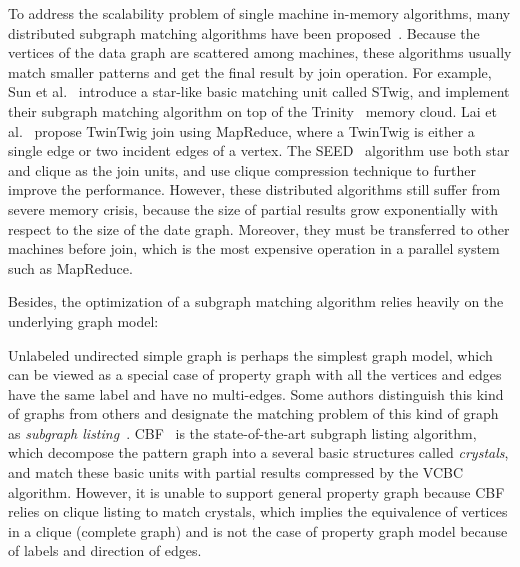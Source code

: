 To address the scalability problem of single machine in-memory algorithms,
many distributed subgraph matching algorithms have been proposed~\cite{DBLP:journals/pvldb/SunWWSL12,DBLP:conf/sigmod/ShaoCCMYX14,DBLP:journals/pvldb/LaiQLC15,DBLP:journals/pvldb/LaiQLZC16,DBLP:conf/cloud/SerafiniMS17}.
Because the vertices of the data graph are scattered among machines,
these algorithms usually match smaller patterns and get the final result by join operation.
For example, Sun et al.~\cite{DBLP:journals/pvldb/SunWWSL12} introduce a star-like basic matching unit called STwig,
and implement their subgraph matching algorithm on top of the Trinity~\cite{shao2012the} memory cloud.
Lai et al.~\cite{DBLP:journals/pvldb/LaiQLC15} propose TwinTwig join using MapReduce,
where a TwinTwig is either a single edge or two incident edges of a vertex.
The SEED~\cite{DBLP:journals/pvldb/LaiQLZC16} algorithm use both star and clique as the join units,
and use clique compression technique to further improve the performance.
However, these distributed algorithms still suffer from severe memory crisis,
because the size of partial results grow exponentially with respect to the size of the date graph.
Moreover, they must be transferred to other machines before join,
which is the most expensive operation in a parallel system such as MapReduce.

Besides, the optimization of a subgraph matching algorithm relies heavily on the underlying graph model:

Unlabeled undirected simple graph is perhaps the simplest graph model,
which can be viewed as a special case of property graph with all the vertices and edges have the same label and have no multi-edges.
Some authors distinguish this kind of graphs from others and designate the matching problem of this kind of graph as \emph{subgraph listing}~\cite{DBLP:conf/sigmod/ShaoCCMYX14,DBLP:journals/jacm/Ullmann76,DBLP:conf/sigmod/ShaoCCMYX14,DBLP:journals/pvldb/LaiQLC15,DBLP:conf/sigmod/KimLBHLKJ16,DBLP:journals/pvldb/LaiQLZC16,DBLP:journals/pvldb/QiaoZC17}.
CBF~\cite{DBLP:journals/pvldb/QiaoZC17} is the state-of-the-art subgraph listing algorithm,
which decompose the pattern graph into a several basic structures called \emph{crystals},
and match these basic units with partial results compressed by the VCBC algorithm.
However, it is unable to support general property graph because CBF relies on clique listing to match crystals,
which implies the equivalence of vertices in a clique (complete graph) and is not the case of property graph model because of labels and direction of edges.

